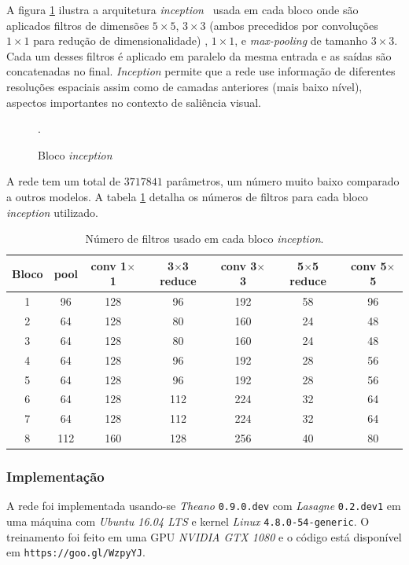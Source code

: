 \documentclass[11pt]{article}
\newcommand{\tit}[1]{\textit{#1}}
\begin{document}
A figura \ref{fig:newinception} ilustra a arquitetura
\tit{inception}~\cite{szegedy_2014}
usada em cada bloco onde são aplicados
filtros de dimensões $5 \times 5$, $3 \times 3$
(ambos precedidos por convoluções $1\times 1$ para redução de dimensionalidade)
, $1 \times 1$, e \tit{max-pooling} de tamanho $3 \times 3$.
Cada um desses filtros é aplicado em paralelo da mesma entrada e as saídas
são concatenadas no final.
\tit{Inception} permite que a rede use informação de diferentes resoluções
espaciais assim como de camadas anteriores (mais baixo nível),
aspectos importantes no contexto de saliência visual.

\begin{figure}[H]
    \centering
    \def\svgwidth{0.57\linewidth}
    
    \caption{Bloco \tit{inception}}.
   \label{fig:newinception}
\end{figure}

A rede tem um total de $3717841$ parâmetros, um número muito baixo comparado
a outros modelos.
A tabela \ref{table:inception} detalha os números de filtros para cada
bloco \tit{inception} utilizado.

\begin{table}[H]
\centering
	\small
\label{table:inception}
\caption{Número de filtros usado em cada bloco \tit{inception}.}
\begin{tabular}{|c|c|c|c|c|c|c|}
	\hline
    Bloco & pool & conv 1$\times$1 & 3$\times$3 reduce &
    conv 3$\times$3 & 5$\times$5 reduce & conv 5$\times$5\\
    \hline
    1 & 96 & 128 & 96 & 192 & 58 & 96\\
    \hline
    2 & 64 & 128 & 80 & 160 & 24 & 48\\
    \hline
    3 & 64 & 128 & 80 & 160 & 24 & 48\\
    \hline
    4 & 64 & 128 & 96 & 192 & 28 & 56\\
    \hline
    5 & 64 & 128 & 96 & 192 & 28 & 56\\
    \hline
    6 & 64 & 128 & 112 & 224 & 32 & 64\\
    \hline
    7 & 64 & 128 & 112 & 224 & 32 & 64\\
    \hline
    8 & 112 & 160 & 128 & 256 & 40 & 80\\
    \hline
\end{tabular}
\end{table}

\subsubsection{Implementação}
A rede foi implementada usando-se \emph{Theano} \texttt{0.9.0.dev}
com \emph{Lasagne} \texttt{0.2.dev1}
em uma máquina com \emph{Ubuntu 16.04 LTS} e
kernel \emph{Linux} \texttt{4.8.0-54-generic}.
O treinamento foi feito em uma GPU \emph{NVIDIA GTX 1080} e o código está
disponível em \texttt{https://goo.gl/WzpyYJ}.
\end{document}
